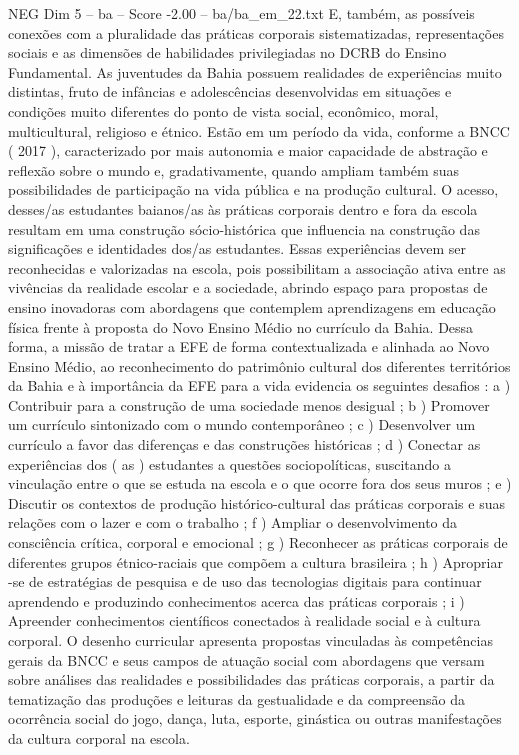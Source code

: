 \begin{textsample}{NEG Dim 5 – ba – Score -2.00 – ba/ba\_em\_22.txt}
E, também, as possíveis conexões com a pluralidade das práticas corporais sistematizadas, representações sociais e as dimensões de habilidades privilegiadas no DCRB do Ensino Fundamental.
As juventudes da Bahia possuem realidades de experiências muito distintas, fruto de infâncias e adolescências desenvolvidas em situações e condições muito diferentes do ponto de vista social, econômico, moral, multicultural, religioso e étnico.
Estão em um período da vida, conforme a BNCC ( 2017 ), caracterizado por mais autonomia e maior capacidade de abstração e reflexão sobre o mundo e, gradativamente, quando ampliam também suas possibilidades de participação na vida pública e na produção cultural.
O acesso, desses/as estudantes baianos/as às práticas corporais dentro e fora da escola resultam em uma construção sócio-histórica que influencia na construção das significações e identidades dos/as estudantes.
Essas experiências devem ser reconhecidas e valorizadas na escola, pois possibilitam a associação ativa entre as vivências da realidade escolar e a sociedade, abrindo espaço para propostas de ensino inovadoras com abordagens que contemplem aprendizagens em educação física frente à proposta do Novo Ensino Médio no currículo da Bahia.
Dessa forma, a missão de tratar a EFE de forma contextualizada e alinhada ao Novo Ensino Médio, ao reconhecimento do patrimônio cultural dos diferentes territórios da Bahia e à importância da EFE para a vida evidencia os seguintes desafios : a ) Contribuir para a construção de uma sociedade menos desigual ; b ) Promover um currículo sintonizado com o mundo contemporâneo ; c ) Desenvolver um currículo a favor das diferenças e das construções históricas ; d ) Conectar as experiências dos ( as ) estudantes a questões sociopolíticas, suscitando a vinculação entre o que se estuda na escola e o que ocorre fora dos seus muros ; e ) Discutir os contextos de produção histórico-cultural das práticas corporais e suas relações com o lazer e com o trabalho ; f ) Ampliar o desenvolvimento da consciência crítica, corporal e emocional ; g ) Reconhecer as práticas corporais de diferentes grupos étnico-raciais que compõem a cultura brasileira ; h ) Apropriar -se de estratégias de pesquisa e de uso das tecnologias digitais para continuar aprendendo e produzindo conhecimentos acerca das práticas corporais ; i ) Apreender conhecimentos científicos conectados à realidade social e à cultura corporal.
O desenho curricular apresenta propostas vinculadas às competências gerais da BNCC e seus campos de atuação social com abordagens que versam sobre análises das realidades e possibilidades das práticas corporais, a partir da tematização das produções e leituras da gestualidade e da compreensão da ocorrência social do jogo, dança, luta, esporte, ginástica ou outras manifestações da cultura corporal na escola.

\end{textsample}
